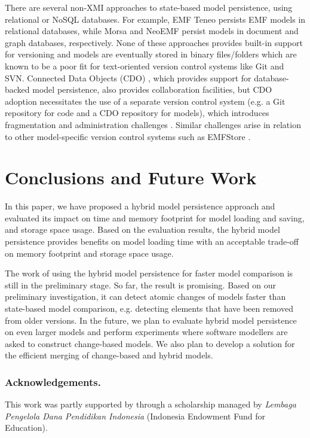 \documentclass{llncs}
\begin{document}
\vspace{-10pt}
There are several non-XMI approaches to state-based model persistence, using relational or NoSQL databases. For example, EMF Teneo \cite{eclipse2017teneo} persists EMF models in relational databases, while Morsa \cite{DBLP:conf/models/Espinazo-PaganCM11} and NeoEMF \cite{daniel2016neoemf} persist models in document and graph databases, respectively. None of these approaches provides built-in support for versioning and models are eventually stored in binary files/folders which are known to be a poor fit for text-oriented version control systems like Git and SVN. Connected Data Objects (CDO) \cite{eclipse2017cdo}, which provides support for database-backed model persistence, also provides collaboration facilities, but CDO adoption necessitates the use of a separate version control system (e.g. a Git repository for code and a CDO repository for models), which introduces fragmentation and administration challenges \cite{barmpis2014evaluation}. Similar challenges arise in relation to other model-specific version control systems such as EMFStore \cite{koegel2010emfstore}. %

\vspace{-10pt}
\section{Conclusions and Future Work}
\label{sec:conlcusions_and_future_work}

\vspace{-10pt}
In this paper, we have proposed a hybrid model persistence approach and evaluated its impact on time and memory footprint for model loading and saving, and storage space usage.
Based on the evaluation results, the hybrid model persistence provides benefits on model loading time 
with an acceptable trade-off on memory footprint and storage space usage. 

The work of using the hybrid model persistence for faster model comparison is still in the preliminary stage. So far, the result is promising. Based on our preliminary investigation, it can detect atomic changes of models faster than state-based model comparison, e.g. detecting elements that have been removed from older versions. In the future, we plan to evaluate hybrid model persistence on even larger models and perform experiments where software modellers are asked to construct change-based models. We also plan to develop a solution for the efficient merging of change-based and hybrid models. 

\vspace{-10pt}
\subsubsection*{Acknowledgements.} This work was partly supported by through a scholarship managed by \emph{Lembaga Pengelola Dana Pendidikan Indonesia} (Indonesia Endowment Fund for Education).

 

\end{document}
